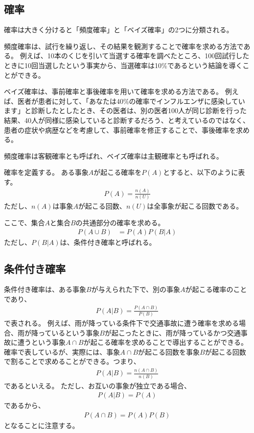 \documentclass{ltjsarticle}
\begin{document}
\subsection{確率}
確率は大きく分けると「頻度確率」と「ベイズ確率」の2つに分類される。
\par
頻度確率は、試行を繰り返し、その結果を観測することで確率を求める方法である。
例えば、10本のくじを引いて当選する確率を調べたところ、100回試行したときに10回当選したという事実から、当選確率は10\%であるという結論を導くことができる。
\par
ベイズ確率は、事前確率と事後確率を用いて確率を求める方法である。
例えば、医者が患者に対して、「あなたは40\%の確率でインフルエンザに感染しています」と診断したとしたとき、その医者は、別の医者100人が同じ診断を行った結果、40人が同様に感染していると診断するだろう、と考えているのではなく、患者の症状や病歴などを考慮して、事前確率を修正することで、事後確率を求める。
\par
頻度確率は客観確率とも呼ばれ、ベイズ確率は主観確率とも呼ばれる。

\par
確率を定義する。
ある事象$A$が起こる確率を$P(A)$とすると、以下のように表す。
\begin{align}
P(A) = \frac{n(A)}{n(U)}
\end{align}
ただし、$n(A)$は事象$A$が起こる回数、$n(U)$は全事象が起こる回数である。

\par
ここで、集合$A$と集合$B$の共通部分の確率を求める。
\begin{align}
  P (A \cup B) &= P (A) P(B|A)
\end{align}
ただし、$P(B|A)$は、条件付き確率と呼ばれる。

\subsection{条件付き確率}
条件付き確率は、ある事象$B$が与えられた下で、別の事象$A$が起こる確率のことであり、
\begin{align}
P(A|B) = \frac{P(A \cap B)}{P(B)}
\end{align}
で表される。  
例えば、雨が降っている条件下で交通事故に遭う確率を求める場合、雨が降っているという事象$B$が起こったときに、雨が降っているかつ交通事故に遭うという事象$A \cap B$が起こる確率を求めることで導出することができる。確率で表しているが、実際には、事象$A \cap B$が起こる回数を事象$B$が起こる回数で割ることで求めることができる。つまり、
\begin{align}
P(A|B) = \frac{n(A \cap B)}{n(B)}
\end{align}
であるといえる。
ただし、お互いの事象が独立である場合、
\begin{align}
P(A|B) = P(A)
\end{align}
であるから、
\begin{align}
P(A \cap B) = P(A) P(B)
\end{align}
となることに注意する。
\end{document}
